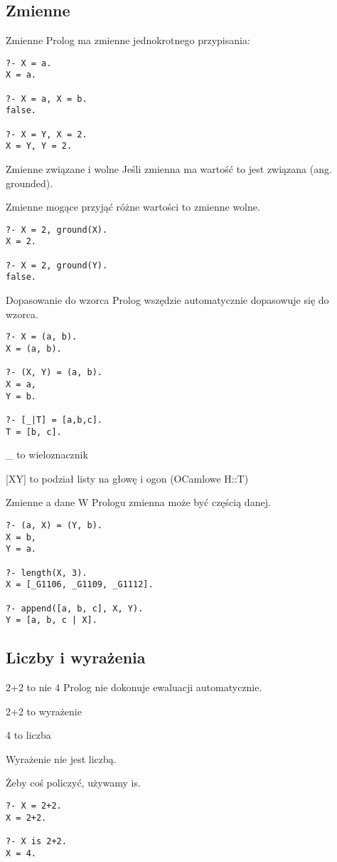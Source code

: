 \documentclass[blue]{beamer}
\begin{document}
\subsection{Zmienne}
\begin{frame}[fragile]{Zmienne}
Prolog ma zmienne jednokrotnego przypisania:
\begin{lstlisting}
?- X = a.
X = a.

?- X = a, X = b.
false.

?- X = Y, X = 2.
X = Y, Y = 2.
\end{lstlisting}
\end{frame}
\begin{frame}[fragile]{Zmienne związane i wolne}
Jeśli zmienna ma wartość to jest związana (ang. grounded).

Zmienne mogące przyjąć różne wartości to zmienne wolne.
\begin{lstlisting}
?- X = 2, ground(X).
X = 2.

?- X = 2, ground(Y).
false.
\end{lstlisting}
\end{frame}
\begin{frame}[fragile]{Dopasowanie do wzorca}
Prolog wszędzie automatycznie dopasowuje się do wzorca.
\begin{lstlisting}
?- X = (a, b).
X = (a, b).

?- (X, Y) = (a, b).
X = a,
Y = b.

?- [_|T] = [a,b,c].
T = [b, c].
\end{lstlisting}
\_ to wieloznacznik

[X\textbar Y] to podział listy na głowę i ogon (OCamlowe H::T)
\end{frame}
\begin{frame}[fragile]{Zmienne a dane}
W Prologu zmienna może być częścią danej.
\begin{lstlisting}
?- (a, X) = (Y, b).
X = b,
Y = a.

?- length(X, 3).
X = [_G1106, _G1109, _G1112].

?- append([a, b, c], X, Y).
Y = [a, b, c | X].
\end{lstlisting}
\end{frame}
\subsection{Liczby i wyrażenia}
\begin{frame}[fragile]{2+2 to nie 4}
Prolog nie dokonuje ewaluacji automatycznie.

2+2 to wyrażenie

4 to liczba

Wyrażenie nie jest liczbą.

Żeby coś policzyć, używamy is.

\begin{lstlisting}
?- X = 2+2.
X = 2+2.

?- X is 2+2.
X = 4.
\end{lstlisting}
\end{frame}
\end{document}
